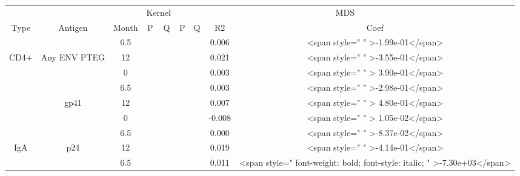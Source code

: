 \documentclass[12pt]{article} %
\begin{document}
 
\begin{tabular}{ccccccccc}
\toprule
\multicolumn{3}{c}{ } & \multicolumn{2}{c}{Kernel} & \multicolumn{4}{c}{MDS} \\
\cmidrule(l{2pt}r{2pt}){4-5} \cmidrule(l{2pt}r{2pt}){6-9}
Type & Antigen & Month & P & Q & P & Q & R2 & Coef\\
\midrule
 &  & 6.5 & \cellcolor{white}{0.602} & \cellcolor{white}{0.803} & \cellcolor{white}{0.579} & \cellcolor{white}{0.343} & 0.006 & <span style="     " >-1.99e-01</span>\\
\cmidrule{3-9}
\multirow{-2}{*}{\centering\arraybackslash CD4+} & \multirow{-2}{*}{\centering\arraybackslash Any ENV PTEG} & 12 & \cellcolor{white}{0.193} & \cellcolor{white}{0.499} & \cellcolor{white}{0.304} & \cellcolor{white}{0.235} & 0.021 & <span style="     " >-3.55e-01</span>\\
\cmidrule{1-9}
 &  & 0 & \cellcolor{white}{0.992} & \cellcolor{white}{0.992} & \cellcolor{white}{0.629} & \cellcolor{white}{0.343} & 0.003 & <span style="     " > 3.90e-01</span>\\
\cmidrule{3-9}
 &  & 6.5 & \cellcolor{white}{0.454} & \cellcolor{white}{0.698} & \cellcolor{white}{0.629} & \cellcolor{white}{0.343} & 0.003 & <span style="     " >-2.98e-01</span>\\
\cmidrule{3-9}
 & \multirow{-3}{*}{\centering\arraybackslash gp41} & 12 & \cellcolor{white}{0.660} & \cellcolor{white}{0.824} & \cellcolor{white}{0.489} & \cellcolor{white}{0.320} & 0.007 & <span style="     " > 4.80e-01</span>\\
\cmidrule{2-9}
 &  & 0 & \cellcolor{white}{0.955} & \cellcolor{white}{0.992} & \cellcolor{white}{0.429} & \cellcolor{white}{0.301} & -0.008 & <span style="     " > 1.05e-02</span>\\
\cmidrule{3-9}
 &  & 6.5 & \cellcolor{white}{0.979} & \cellcolor{white}{0.992} & \cellcolor{white}{0.882} & \cellcolor{white}{0.452} & 0.000 & <span style="     " >-8.37e-02</span>\\
\cmidrule{3-9}
\multirow{-6}{*}{\centering\arraybackslash IgA} & \multirow{-3}{*}{\centering\arraybackslash p24} & 12 & \cellcolor{white}{0.556} & \cellcolor{white}{0.794} & \cellcolor{white}{0.311} & \cellcolor{white}{0.235} & 0.019 & <span style="     " >-4.14e-01</span>\\
\cmidrule{1-9}
 &  & 6.5 & \cellcolor{white}{0.060} & \cellcolor{white}{0.300} & \cellcolor{yellow}{\textbf{0.028}} & \cellcolor{green}{\textbf{0.092}} & 0.011 & <span style=" font-weight: bold; font-style: italic;   " >-7.30e+03</span>\\

\end{tabular}
\end{document}
